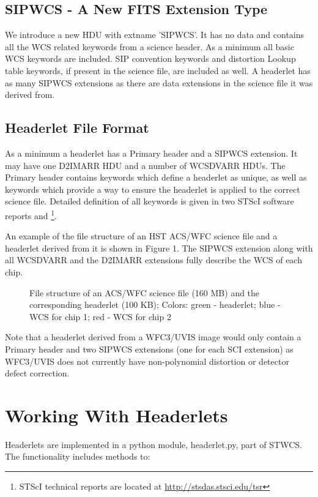 \subsection{SIPWCS - A New FITS Extension Type}
We introduce a new HDU with extname 'SIPWCS'. It has no data and contains all the WCS related keywords from a science header. As a minimum all basic WCS keywords \citep{greisen_2002} are included. SIP convention keywords \citep{shupe_2005} and distortion Lookup table keywords, if present in the science file, are included as well. A headerlet has as many SIPWCS extensions as there are data extensions in the science file it was derived from. 

\subsection{Headerlet File Format}
As a minimum a headerlet has a Primary header  and a SIPWCS extension. It may have one D2IMARR HDU and a number of WCSDVARR HDUs. The Primary header contains keywords which define a headerlet as unique, as well as keywords which provide a way to ensure the headerlet is applied to the correct science file. Detailed definition of all keywords is given in two STScI software reports \citet{hack_fc} and \citet{hack_hlet}\footnote{STScI technical reports are located at \url{http://stsdas.stsci.edu/tsr}}.

An example of the file structure of an HST ACS/WFC science file and a headerlet derived from it is shown in Figure 1. The SIPWCS extension along with all WCSDVARR and the D2IMARR extensions fully describe the WCS of each chip.

\begin{figure}[!h]
\caption{File structure of an ACS/WFC science file (160 MB) and the corresponding headerlet (100 KB); Colors: green - headerlet; blue - WCS for chip 1; red - WCS for chip 2}
\end{figure}

Note that a headerlet derived from a WFC3/UVIS image would only contain a Primary header and two SIPWCS extensions (one for each SCI extension) as WFC3/UVIS does not currently have non-polynomial distortion or detector defect correction.

\section{Working With Headerlets}
Headerlets are implemented in a python module, headerlet.py, part of STWCS. The functionality includes methods to:

